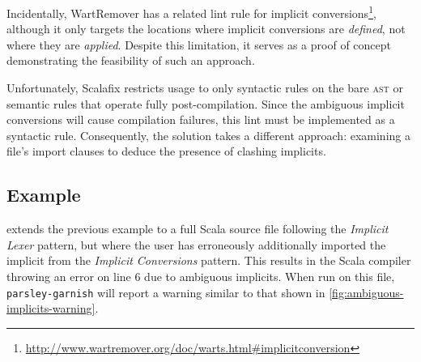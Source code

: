 \documentclass[../../main.tex]{subfiles}
\begin{document}
Incidentally, WartRemover has a related lint rule for implicit conversions\footnote{\url{http://www.wartremover.org/doc/warts.html#implicitconversion}},
although it only targets the locations where implicit conversions are \emph{defined}, not where they are \emph{applied}.
Despite this limitation, it serves as a proof of concept demonstrating the feasibility of such an approach.

Unfortunately, Scalafix restricts usage to only syntactic rules on the bare \textsc{ast} or semantic rules that operate fully post-compilation.
Since the ambiguous implicit conversions will cause compilation failures, this lint must be implemented as a syntactic rule.
Consequently, the solution takes a different approach: examining a file's import clauses to deduce the presence of clashing implicits.

\subsection{Example}
 extends the previous example to a full Scala source file following the \emph{Implicit Lexer} pattern,
but where the user has erroneously additionally imported the  implicit from the \emph{Implicit Conversions} pattern.
This results in the Scala compiler throwing an error on line 6 due to ambiguous implicits.
When run on this file, \texttt{parsley-garnish} will report a warning similar to that shown in \cref{fig:ambiguous-implicits-warning}.
\end{document}
